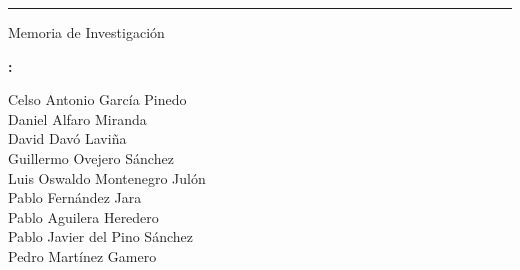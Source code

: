\documentclass[14pt]{scrreprt}
\title{\productname}
\author{Grupo 4}
\date{\today}
\newcommand{\authorfull}{
    Celso Antonio García Pinedo \\
    Daniel Alfaro Miranda \\
    David Davó Laviña \\
    Guillermo Ovejero Sánchez \\
    Luis Oswaldo Montenegro Julón \\
    Pablo Fernández Jara \\
    Pablo Aguilera Heredero \\
    Pablo Javier del Pino Sánchez \\
    Pedro Martínez Gamero
}
\begin{document}
\begin{titlepage}
\makeatletter
{
\centering
\vspace*{4cm}
{\fontsize{40pt}{40pt}\bfseries\scshape\@title\par}
{\rule{0.5\textwidth}{1pt}\par}


{\Huge Memoria de Investigación\par}

\vspace*{1cm}
{\Large\textbf{\@author :}  \par}
{\large\itshape 
\authorfull
\par}
}
\vfill
\makeatother
\end{titlepage}

\tableofcontents


% 




\appendix



\end{document}
